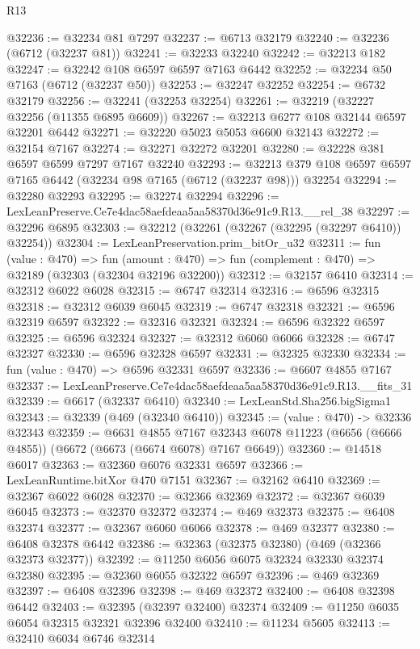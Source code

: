 \begin{lexlean}{R13}
\begin{coremodule}
@32236 := @32234 @81 @7297
@32237 := @6713 @32179
@32240 := @32236 (@6712 (@32237 @81))
@32241 := @32233 @32240
@32242 := @32213 @182
@32247 := @32242 @108 @6597 @6597 @7163 @6442
@32252 := @32234 @50 @7163 (@6712 (@32237 @50))
@32253 := @32247 @32252
@32254 := @6732 @32179
@32256 := @32241 (@32253 @32254)
@32261 := @32219 (@32227 @32256 (@11355 @6895 @6609))
@32267 := @32213 @6277 @108 @32144 @6597 @32201 @6442
@32271 := @32220 @5023 @5053 @6600 @32143
@32272 := @32154 @7167
@32274 := @32271 @32272 @32201
@32280 := @32228 @381 @6597 @6599 @7297 @7167 @32240
@32293 := @32213 @379 @108 @6597 @6597 @7165 @6442 (@32234 @98 @7165 (@6712 (@32237 @98))) @32254
@32294 := @32280 @32293
@32295 := @32274 @32294
@32296 := LexLeanPreserve.Ce7e4dac58aefdeaa5aa58370d36e91c9.R13.__rel_38
@32297 := @32296 @6895
@32303 := @32212 (@32261 (@32267 (@32295 (@32297 @6410)) @32254))
@32304 := LexLeanPreservation.prim_bitOr_u32
@32311 := fun (value : @470) =>
  fun (amount : @470) => fun (complement : @470) => @32189 (@32303 (@32304 @32196 @32200))
@32312 := @32157 @6410
@32314 := @32312 @6022 @6028
@32315 := @6747 @32314
@32316 := @6596 @32315
@32318 := @32312 @6039 @6045
@32319 := @6747 @32318
@32321 := @6596 @32319 @6597
@32322 := @32316 @32321
@32324 := @6596 @32322 @6597
@32325 := @6596 @32324
@32327 := @32312 @6060 @6066
@32328 := @6747 @32327
@32330 := @6596 @32328 @6597
@32331 := @32325 @32330
@32334 := fun (value : @470) => @6596 @32331 @6597
@32336 := @6607 @4855 @7167
@32337 := LexLeanPreserve.Ce7e4dac58aefdeaa5aa58370d36e91c9.R13.__fits_31
@32339 := @6617 (@32337 @6410)
@32340 := LexLeanStd.Sha256.bigSigma1
@32343 := @32339 (@469 (@32340 @6410))
@32345 := (value : @470) -> @32336 @32343
@32359 := @6631
    @4855
    @7167
    @32343
    @6078
    @11223
    (@6656 (@6666 @4855))
    (@6672 (@6673 (@6674 @6078) @7167 @6649))
@32360 := @14518 @6017
@32363 := @32360 @6076 @32331 @6597
@32366 := LexLeanRuntime.bitXor @470 @7151
@32367 := @32162 @6410
@32369 := @32367 @6022 @6028
@32370 := @32366 @32369
@32372 := @32367 @6039 @6045
@32373 := @32370 @32372
@32374 := @469 @32373
@32375 := @6408 @32374
@32377 := @32367 @6060 @6066
@32378 := @469 @32377
@32380 := @6408 @32378 @6442
@32386 := @32363 (@32375 @32380) (@469 (@32366 @32373 @32377))
@32392 := @11250 @6056 @6075 @32324 @32330 @32374 @32380
@32395 := @32360 @6055 @32322 @6597
@32396 := @469 @32369
@32397 := @6408 @32396
@32398 := @469 @32372
@32400 := @6408 @32398 @6442
@32403 := @32395 (@32397 @32400) @32374
@32409 := @11250 @6035 @6054 @32315 @32321 @32396 @32400
@32410 := @11234 @5605
@32413 := @32410 @6034 @6746 @32314

\end{coremodule}
\end{lexlean}
